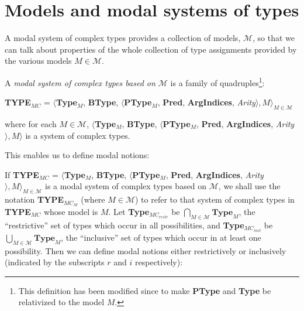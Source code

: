 \section{Models and modal systems of types}
\label{app:modal}



A modal system of complex types
provides a collection of models, $\mathcal{M}$, so that we can talk about properties of the whole collection of
type assignments provided by the various models $M\in\mathcal{M}$.

A \textit{modal system of complex types based on $\mathcal{M}$} is a
family of quadruples\footnote{This definition has been modified since
  \cite{Cooper2012} to make \textbf{PType} and \textbf{Type} be
  relativized to the model $M$.}:
\begin{display}
{\bf TYPE$_{\mathit{MC}}$} = $\langle${\bf Type}$_M$, {\bf BType},
$\langle$\textbf{PType}$_M$, {\bf Pred}, \textbf{ArgIndices}, {\it Arity\/}$\rangle, M\rangle_{M\in\mathcal{M}}$
\end{display}
where for each $M\in \mathcal{M}$, $\langle${\bf Type}$_M$, {\bf BType},
$\langle$\textbf{PType}$_M$, {\bf Pred}, \textbf{ArgIndices}, {\it Arity\/}$\rangle, M\rangle$ is
a system of complex types.

This enables us to define modal notions:

If {\bf TYPE$_{\mathit{MC}}$} = $\langle${\bf Type}$_M$, {\bf BType},
$\langle$\textbf{PType}$_M$, {\bf Pred}, \textbf{ArgIndices}, {\it Arity\/}$\rangle, M\rangle_{M\in\mathcal{M}}$
is a modal system of complex types based
on $\mathcal{M}$, we shall use the notation {\bf
  TYPE$_{\mathit{MC}_M}$} (where $M\in\mathcal{M}$) to refer to that
system of complex types in {\bf TYPE$_{\mathit{MC}}$} whose model is
$M$.  Let \textbf{Type}$_{\mathit{MC}_{\mathit{restr}}}$ be
  $\bigcap\limits_{M\in\mathcal{M}}\!\textbf{Type}_M$, the
  ``restrictive'' set of
  types which occur in all possibilities,  and \textbf{Type}$_{\mathit{MC}_{\mathit{incl}}}$ be
  $\bigcup\limits_{M\in\mathcal{M}}\!\textbf{Type}_M$, the
  ``inclusive'' set of
  types which occur in at least one possibility.  Then we can define
  modal notions either restrictively or inclusively (indicated by the
  subscripts $r$ and $i$ respectively):

